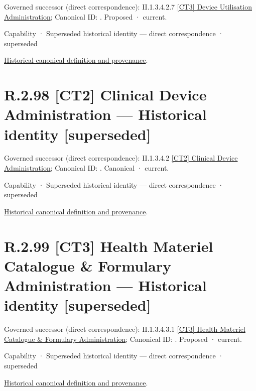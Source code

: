 {\small Governed successor (direct correspondence): II.1.3.4.2.7 \hyperref[element:1a3732b5911c45b3aece38b2db2d0f15]{[CT3] Device Utilisation Administration}; Canonical ID: \texttt{}. Proposed · current.}\par
\label{element:a0af0a86667d48f4ab95ed2920e878cb}
{\small Capability · Superseded historical identity — direct correspondence · superseded}\par
\href{../../../../continuum/strategy/capability/a0af0a86667d48f4ab95ed2920e878cb.md}{Historical canonical definition and provenance}.\par
\section*{R.2.98 [CT2] Clinical Device Administration — Historical identity [superseded]}
\label{navigation:R.2.98}

{\small Governed successor (direct correspondence): II.1.3.4.2 \hyperref[element:31bcd6fda0d14cc8b992cdca39a3cbed]{[CT2] Clinical Device Administration}; Canonical ID: \texttt{}. Canonical · current.}\par
\label{element:3792be10541e4d68b3f740b1ba964966}
{\small Capability · Superseded historical identity — direct correspondence · superseded}\par
\href{../../../../continuum/strategy/capability/3792be10541e4d68b3f740b1ba964966.md}{Historical canonical definition and provenance}.\par
\section*{R.2.99 [CT3] Health Materiel Catalogue \& Formulary Administration — Historical identity [superseded]}
\label{navigation:R.2.99}

{\small Governed successor (direct correspondence): II.1.3.4.3.1 \hyperref[element:28b327760af94b8b986357469524d793]{[CT3] Health Materiel Catalogue \& Formulary Administration}; Canonical ID: \texttt{}. Proposed · current.}\par
\label{element:5c691959e2cc4a289fc25b9f3497eed9}
{\small Capability · Superseded historical identity — direct correspondence · superseded}\par
\href{../../../../continuum/strategy/capability/5c691959e2cc4a289fc25b9f3497eed9.md}{Historical canonical definition and provenance}.\par
